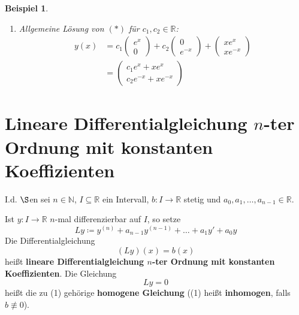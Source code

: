 \documentclass[12pt]{extreport} %
\newcommand{\N}{\mathbb{N}}
\newcommand{\R}{\mathbb{R}}
\theoremstyle{named}
\theoremstyle{nnamed}
\theoremstyle{itshape}
\theoremstyle{normal}
\newtheorem*{beispiel*}{Beispiel}
\begin{document}
\begin{beispiel*}
\begin{enumerate}[label=\arabic*.]
			$\Rightarrow y_{p}(x) = \begin{pmatrix} e^{x} & 0 \\ 0 & e^{-x} \end{pmatrix} \begin{pmatrix} x \\ x \end{pmatrix} = \begin{pmatrix} x e^{x} \\ x e^{-x} \end{pmatrix}$
		\item Allgemeine Lösung von $(*)$ für $c_{1}, c_{2} \in \R$:
			\begin{align*}
				y(x) & = c_{1} \begin{pmatrix} e^{x} \\ 0 \end{pmatrix}  + c_{2} \begin{pmatrix} 0 \\ e^{-x} \end{pmatrix}  + \begin{pmatrix} x e^{x} \\ x e^{-x} \end{pmatrix}  \\
				& = \begin{pmatrix} c_{1} e^{x} + x e^{x} \\ c_{2} e^{-x} + x e^{-x} \end{pmatrix} 
			\end{align*}
	\end{enumerate}
\end{beispiel*}


\chapter{Lineare Differentialgleichung \texorpdfstring{$n$}{n}-ter Ordnung\onlyattoc{\protect\\~} mit konstanten Koeffizienten}

     

I.d. $\S$en sei $n \in \N$, $I \subseteq \R$ ein Intervall, $b \colon I \rightarrow \R$ stetig und $a_{0}, a_{1}, \dotsc, a_{n-1} \in \R$.

\bigskip

Ist $y \colon I \rightarrow \R$ $n$-mal differenzierbar auf $I$, so setze
	$$ L y \coloneqq y^{(n)} + a_{n-1} y^{(n-1)} + \dotsc + a_{1} y' + a_{0} y $$
Die Differentialgleichung  
\begin{equation*}
	\left( L y \right) (x) = b(x) \tag*{(1)}
\end{equation*}
hei{\ss}t \textbf{lineare Differentialgleichung $n$-ter Ordnung mit konstanten Koeffizienten}. Die Gleichung
\begin{equation*}
	Ly = 0 \tag*{(*)}
\end{equation*}
hei{\ss}t die zu (1) gehörige \textbf{homogene Gleichung} ((1) hei{\ss}t \textbf{inhomogen}, falls $b \not\equiv 0$).
\end{document}
